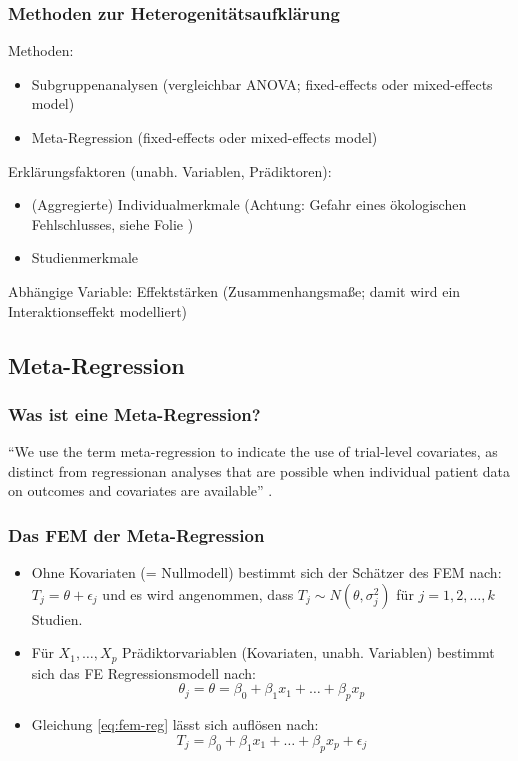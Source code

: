 \begin{frame}
  \frametitle{Methoden zur Heterogenitätsaufklärung }
  Methoden:
  \begin{itemize}
  \item Subgruppenanalysen (vergleichbar ANOVA; fixed-effects oder mixed-effects model)
  \item Meta-Regression (fixed-effects oder mixed-effects model)
  \end{itemize}
  Erklärungsfaktoren (unabh. Variablen, Prädiktoren):
  \begin{itemize}
  \item (Aggregierte) Individualmerkmale (Achtung: Gefahr eines ökologischen Fehlschlusses, siehe Folie \pageref{ref:oekofehlschluss})
  \item Studienmerkmale
  \end{itemize}
  Abhängige Variable: Effektstärken (Zusammenhangsmaße; damit wird ein Interaktionseffekt modelliert)
\end{frame}


\subsection{Meta-Regression}


\begin{frame}
  \frametitle{Was ist eine Meta-Regression?}

  "`We use the term meta-regression to indicate the use of trial-level covariates, as distinct from regressionan analyses
  that are possible when individual patient data on outcomes and covariates are available"' \citep[1560]{thompson_how_2002}.

\end{frame}


\begin{frame}
  \frametitle{Das FEM der Meta-Regression}
  \begin{itemize}
  \item Ohne Kovariaten (= Nullmodell) bestimmt sich der Schätzer des FEM nach:
    $T_j = \theta + \epsilon_j$ und es wird angenommen, dass $T_j \sim N(\theta,
    \sigma_j^2)$ für $j = 1,2,\ldots,k$ Studien.
  \item Für $X_1, \ldots, X_p$ Prädiktorvariablen (Kovariaten,
    unabh. Variablen) bestimmt sich das FE Regressionsmodell nach:
    \begin{equation}\label{eq:fem-reg}
      \theta_j = \theta = \beta_0 + \beta_1 x_1 + \ldots + \beta_px_p
    \end{equation}
  \item Gleichung \ref{eq:fem-reg} lässt sich auflösen nach:
    \begin{equation}
      T_j = \beta_0 + \beta_1 x_1 + \ldots + \beta_px_p + \epsilon_j
    \end{equation}
  \end{itemize}

  \citep[Quelle: ][94]{sutton_methods_2000}

\end{frame}


